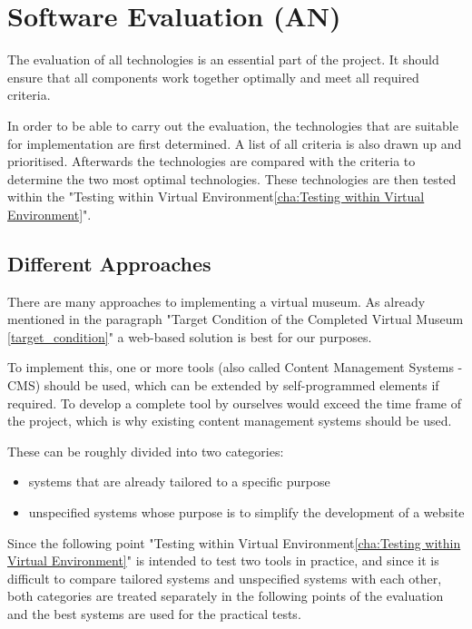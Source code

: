 \chapter{Software Evaluation (AN)}
\label{cha:Requirements Analysis}
The evaluation of all technologies is an essential part of the project. It should ensure that all components work together optimally and meet all required criteria.

In order to be able to carry out the evaluation, the technologies that are suitable for implementation are first determined. A list of all criteria is also drawn up and prioritised. Afterwards the technologies are compared with the criteria to determine the two most optimal technologies. These technologies are then tested within the "Testing within Virtual Environment\ref{cha:Testing within Virtual Environment}".


\section{Different Approaches}

There are many approaches to implementing a virtual museum. As already mentioned in the paragraph "Target Condition of the Completed Virtual Museum \ref{target_condition}" a web-based solution is best for our purposes.

To implement this, one or more tools (also called Content Management Systems - CMS) should be used, which can be extended by self-programmed elements if required. To develop a complete tool by ourselves would exceed the time frame of the project, which is why existing content management systems should be used.

These can be roughly divided into two categories:
\begin{itemize}
	\item systems that are already tailored to a specific purpose
	\item unspecified systems whose purpose is to simplify the development of a website
\end{itemize}

\vspace{0.5cm}

Since the following point "Testing within Virtual Environment\ref{cha:Testing within Virtual Environment}" is intended to test two tools in practice, and since it is difficult to compare tailored systems and unspecified systems with each other, both categories are treated separately in the following points of the evaluation and the best systems are used for the practical tests.


